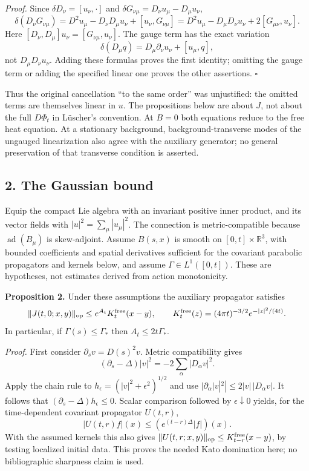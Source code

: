 \documentclass[11pt,a4paper]{article}
\begin{document}
\emph{Proof.} Since \(\delta D_\nu=[u_\nu,\cdot]\) and
\(\delta G_{\nu\mu}=D_\nu u_\mu-D_\mu u_\nu\),
\[\delta(D_\nu G_{\nu\mu})
=D^2u_\mu-D_\nu D_\mu u_\nu+[u_\nu,G_{\nu\mu}]
=D^2u_\mu-D_\mu D_\nu u_\nu+2[G_{\mu\nu},u_\nu].\] Here
\([D_\nu,D_\mu]u_\nu=[G_{\nu\mu},u_\nu]\). The gauge term has the exact
variation \[\delta(D_\mu q)=D_\mu\partial_\nu u_\nu+[u_\mu,q],\] not
\(D_\mu D_\nu u_\nu\). Adding these formulas proves the first identity;
omitting the gauge term or adding the specified linear one proves the
other assertions. \(\square\)

Thus the original cancellation ``to the same order'' was unjustified:
the omitted terms are themselves linear in \(u\). The propositions below
are about \(J\), not about the full \(D\Phi_t\) in Lüscher's convention.
At \(B=0\) both equations reduce to the free heat equation. At a
stationary background, background-transverse modes of the ungauged
linearization also agree with the auxiliary generator; no general
preservation of that transverse condition is asserted.

\hypertarget{the-gaussian-bound}{%
\subsection{2. The Gaussian bound}\label{the-gaussian-bound}}

Equip the compact Lie algebra with an invariant positive inner product,
and its vector fields with \(|u|^2=\sum_\mu|u_\mu|^2\). The connection
is metric-compatible because \(\operatorname{ad}(B_\mu)\) is
skew-adjoint. Assume \(B(s,x)\) is smooth on \([0,t]\times\mathbb R^3\),
with bounded coefficients and spatial derivatives sufficient for the
covariant parabolic propagators and kernels below, and assume
\(\Gamma\in L^1([0,t])\). These are hypotheses, not estimates derived
from action monotonicity.

\textbf{Proposition 2.} Under these assumptions the auxiliary propagator
satisfies \[\|J(t,0;x,y)\|_{\rm op}\le e^{A_t}K_t^{\rm free}(x-y),
\qquad K_t^{\rm free}(z)=(4\pi t)^{-3/2}e^{-|z|^2/(4t)}.\] In
particular, if \(\Gamma(s)\le\Gamma_*\) then \(A_t\le2t\Gamma_*\).

\emph{Proof.} First consider \(\partial_s v=D(s)^2v\). Metric
compatibility gives
\[(\partial_s-\Delta)|v|^2=-2\sum_\alpha|D_\alpha v|^2.\] Apply the
chain rule to \(h_\epsilon=(|v|^2+\epsilon^2)^{1/2}\) and use
\(|\partial_\alpha|v|^2|\le2|v|\,|D_\alpha v|\). It follows that
\((\partial_s-\Delta)h_\epsilon\le0\). Scalar comparison followed by
\(\epsilon\downarrow0\) yields, for the time-dependent covariant
propagator \(U(t,r)\), \[|U(t,r)f|(x)\le(e^{(t-r)\Delta}|f|)(x).\] With
the assumed kernels this also gives
\(\|U(t,r;x,y)\|_{\rm op}\le K_{t-r}^{\rm free}(x-y)\), by testing
localized initial data. This proves the needed Kato domination here; no
bibliographic sharpness claim is used.
\end{document}
